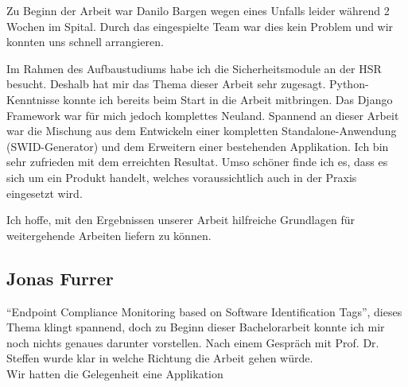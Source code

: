 Zu Beginn der Arbeit war Danilo Bargen wegen eines Unfalls leider während 2
Wochen im Spital. Durch das eingespielte Team war dies kein Problem und wir
konnten uns schnell arrangieren.

Im Rahmen des Aufbaustudiums habe ich die Sicherheitsmodule an der HSR besucht.
Deshalb hat mir das Thema dieser Arbeit sehr zugesagt. Python-Kenntnisse konnte
ich bereits beim Start in die Arbeit mitbringen. Das Django Framework war für
mich jedoch komplettes Neuland. Spannend an dieser Arbeit war die Mischung aus
dem Entwickeln einer kompletten Standalone-Anwendung (SWID-Generator) und dem
Erweitern einer bestehenden Applikation. Ich bin sehr zufrieden mit dem
erreichten Resultat. Umso schöner finde ich es, dass es sich um ein Produkt
handelt, welches voraussichtlich auch in der Praxis eingesetzt wird.

Ich hoffe, mit den Ergebnissen unserer Arbeit hilfreiche Grundlagen für
weitergehende Arbeiten liefern zu können.


\subsection{Jonas Furrer} 



\enquote{Endpoint Compliance Monitoring based on Software Identification Tags}, dieses Thema klingt spannend, doch zu Beginn dieser Bachelorarbeit konnte ich mir noch nichts genaues darunter vorstellen. Nach einem Gespräch mit Prof. Dr. Steffen wurde klar in welche Richtung die Arbeit gehen würde.\\
Wir hatten die Gelegenheit eine Applikation 

